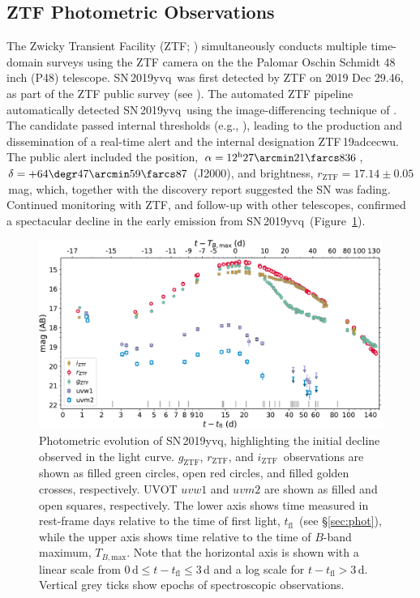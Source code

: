 \documentclass[twocolumn]{aastex63}
\newcommand{\rztf}{$r_\mathrm{ZTF}$}
\newcommand{\gztf}{$g_\mathrm{ZTF}$}
\newcommand{\iztf}{$i_\mathrm{ZTF}$}
\newcommand{\tfl}{$t_\mathrm{fl}$}
\newcommand{\tbmax}{$T_{B,\mathrm{max}}$}
\newcommand{\sn}{SN\,2019yvq}
\begin{document}
\subsection{ZTF Photometric Observations}

The Zwicky Transient Facility (ZTF; \citealt{Bellm19,Graham19,Dekany20})
simultaneously conducts multiple time-domain surveys using the ZTF camera on
the the Palomar Oschin Schmidt 48 inch (P48) telescope. \sn\ was first
detected by ZTF on 2019 Dec 29.46, as part of the ZTF public survey (see
\citealt{Bellm19a}). The automated ZTF pipeline \citep{Masci19} automatically
detected \sn\ using the image-differencing technique of \citet{Zackay16}. The
candidate passed internal thresholds (e.g., \citealt{Mahabal19}), leading to
the production and dissemination of a real-time alert \citep{Patterson19} and
the internal designation ZTF\,19adcecwu. The public alert included the
position, $\alpha = 12^{\mathrm{h}}27\arcmin21\farcs836$, $\delta =
+64\degr47\arcmin59\farcs87$ (J2000), and brightness, \rztf$ =
17.14\pm0.05$\,mag, which, together with the \citet{Itagaki19} discovery
report suggested the SN was fading. Continued monitoring with ZTF, and
follow-up with other telescopes, confirmed a spectacular decline in the early
emission from \sn\ (Figure~\ref{fig:p48}).

\begin{figure}
    \centering
    \includegraphics[width=6in]{./figures/P48_lc.pdf}
    \caption{Photometric evolution of \sn, highlighting the initial decline
    observed in the light curve. \gztf, \rztf, and \iztf\ observations are
    shown as filled green circles, open red circles, and filled golden
    crosses, respectively. UVOT $uvw1$ and $uvm2$ are shown as filled and
    open squares, respectively. The lower axis shows time measured in
    rest-frame days relative to the time of first light, \tfl\ (see
    \S\ref{sec:phot}), while the upper axis shows time relative to the time
    of $B$-band maximum, \tbmax. Note that the horizontal axis is shown with
    a linear scale from $0\,\mathrm{d} \le t - t_\mathrm{fl} \le 3$\,d and a
    log scale for $t - t_\mathrm{fl} > 3$\,d. Vertical grey ticks show
    epochs of spectroscopic observations.}
    \label{fig:p48}
\end{figure}
\end{document}
